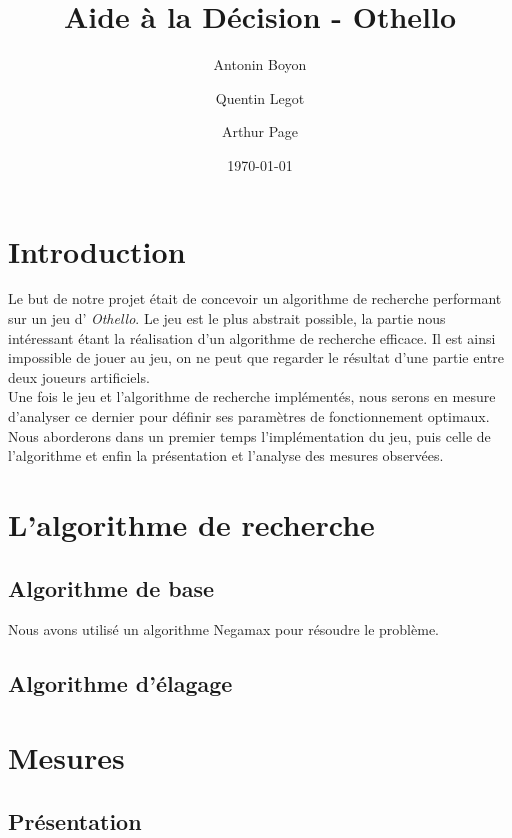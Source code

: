 \documentclass[12pt]{article}
\title{Aide à la Décision - Othello}
\author{Antonin Boyon \and Quentin Legot \and Arthur Page}
\date{\today}
\begin{document}
\maketitle
\thispagestyle{empty}
\setcounter{page}{0}
\newpage

\tableofcontents
\newpage

\section{Introduction}

Le but de notre projet était de concevoir un algorithme de recherche performant sur un jeu d' \textit{Othello}. Le jeu est le plus abstrait possible, la partie nous intéressant étant la réalisation d'un algorithme de recherche efficace. Il est ainsi impossible de jouer au jeu, on ne peut que regarder le résultat d'une partie entre deux joueurs artificiels.\\
Une fois le jeu et l'algorithme de recherche implémentés, nous serons en mesure d'analyser ce dernier pour définir ses paramètres de fonctionnement optimaux. Nous aborderons dans un premier temps l'implémentation du jeu, puis celle de l'algorithme et enfin la présentation et l'analyse des mesures observées.
\newpage

\section{L'algorithme de recherche}
\subsection{Algorithme de base}

Nous avons utilisé un algorithme Negamax pour résoudre le problème.


\newpage

\subsection{Algorithme d'élagage}


\newpage
\section{Mesures}

\subsection{Présentation}
\end{document}
